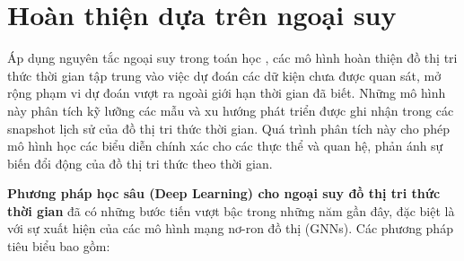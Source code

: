 \section{Hoàn thiện dựa trên ngoại suy}

Áp dụng nguyên tắc ngoại suy trong toán học \cite{ref_article30}, các mô hình hoàn thiện đồ thị tri thức thời gian tập trung vào việc dự đoán các dữ kiện chưa được quan sát, mở rộng phạm vi dự đoán vượt ra ngoài giới hạn thời gian đã biết. Những mô hình này phân tích kỹ lưỡng các mẫu và xu hướng phát triển được ghi nhận trong các snapshot lịch sử của đồ thị tri thức thời gian. Quá trình phân tích này cho phép mô hình học các biểu diễn chính xác cho các thực thể và quan hệ, phản ánh sự biến đổi động của đồ thị tri thức theo thời gian.

\textbf{Phương pháp học sâu (Deep Learning) cho ngoại suy đồ thị tri thức thời gian} đã có những bước tiến vượt bậc trong những năm gần đây, đặc biệt là với sự xuất hiện của các mô hình mạng nơ-ron đồ thị (GNNs). Các phương pháp tiêu biểu bao gồm:

